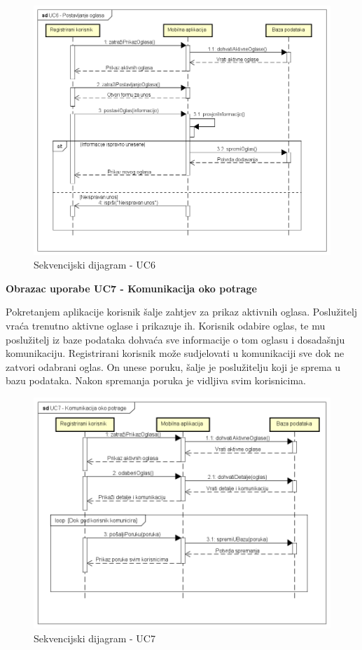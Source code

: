 					\begin{figure}[H]
						\includegraphics[scale=0.65]{dijagrami/sekvencijskiDijagrami/sd6} %
						\centering
						\caption{Sekvencijski dijagram - UC6}
						\label{fig:sDijagram6}
					\end{figure}

				\textbf{Obrazac uporabe UC7 - Komunikacija oko potrage}

				Pokretanjem aplikacije korisnik šalje zahtjev za prikaz aktivnih oglasa. Poslužitelj vraća trenutno aktivne oglase i prikazuje ih. Korisnik odabire oglas, te mu poslužitelj iz baze podataka dohvaća sve informacije o tom oglasu i dosadašnju komunikaciju. Registrirani korisnik može sudjelovati u komunikaciji sve dok ne zatvori odabrani oglas. On unese poruku, šalje je poslužitelju koji je sprema u bazu podataka. Nakon spremanja poruka je vidljiva svim korisnicima.

					\begin{figure}[H]
						\includegraphics[scale=0.65]{dijagrami/sekvencijskiDijagrami/sd7} %
						\centering
						\caption{Sekvencijski dijagram - UC7}
						\label{fig:sDijagram7}
					\end{figure}

